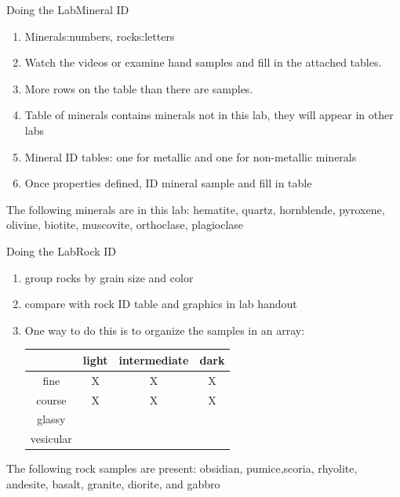 \documentclass[ignorenonframetext,slidestop]{beamer}
\begin{document}
\begin{frame}{Doing the Lab}{Mineral ID}
  \begin{enumerate}
  \item Minerals:numbers, rocks:letters
  \item Watch the videos or examine hand samples and fill in the attached tables.

  \item More rows on the table than there are samples.
  \item Table of minerals contains minerals not in this lab, they will appear in other labs
  \item Mineral ID tables: one for metallic and one for non-metallic minerals
  \item Once properties defined, ID mineral sample and fill in table
  \end{enumerate}
The following minerals are in this lab: hematite, quartz, hornblende, pyroxene, olivine, biotite,
     muscovite, orthoclase, plagioclase
\end{frame}

\begin{frame}{Doing the Lab}{Rock ID}
  \begin{enumerate}
  \item group rocks by grain size and color
  \item compare with rock ID table and graphics in lab handout
  \item One way to do this is to organize the samples in an array:
    \begin{tabular}{c c c c}
      &light& intermediate & dark \\ \hline \hline
      fine& X & X & X \\
      course& X & X & X \\
      glassy&&& \\
      vesicular &&& \\ \hline
    \end{tabular}
  \end{enumerate}
The following rock samples are present: obsidian, pumice,scoria, rhyolite, andesite, basalt, granite, diorite, and gabbro
  
\end{frame}
\end{document}

